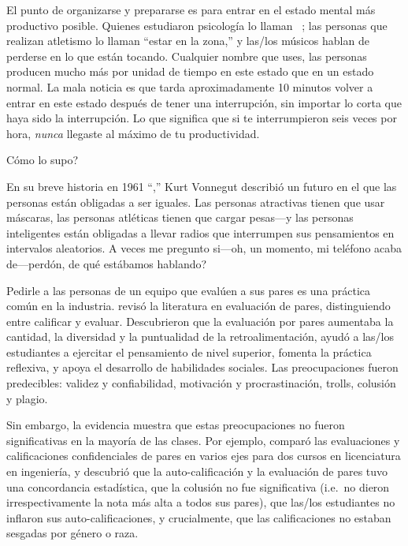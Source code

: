 El punto de organizarse y prepararse es
para entrar en el estado mental más productivo posible.
Quienes estudiaron psicología lo llaman ~\cite{Csik2008};
las personas que realizan atletismo lo llaman ``estar en la zona,''
y las/los músicos hablan de perderse en lo que están tocando.
Cualquier nombre que uses,
las personas producen mucho más por unidad de tiempo en este estado que en un estado normal.
La mala noticia es que
tarda aproximadamente 10 minutos volver a entrar en este estado después de tener una interrupción,
sin importar lo corta que haya sido la interrupción.
Lo que significa que si te interrumpieron seis veces por hora,
\emph{nunca} llegaste al máximo de tu productividad.

\newpage

\begin{aside}{Cómo lo supo?}

  En su breve historia en 1961 ``,''
  Kurt Vonnegut describió un futuro en el que las personas están obligadas a ser iguales.
  Las personas atractivas tienen que usar máscaras,
  las personas atléticas tienen que cargar pesas---y las personas inteligentes
  están obligadas a llevar radios que interrumpen sus pensamientos en intervalos aleatorios.
  A veces me pregunto si---oh, un momento, mi teléfono acaba de---perdón, de qué estábamos hablando?

\end{aside}


Pedirle a las personas de un equipo que evalúen a sus pares es una práctica común en la industria.
\cite{Sond2012} revisó la literatura en evaluación de pares,
distinguiendo entre calificar y evaluar.
Descubrieron que la evaluación por pares aumentaba la cantidad, la diversidad y la puntualidad de la retroalimentación,
ayudó a las/los estudiantes a ejercitar el pensamiento de nivel superior,
fomenta la práctica reflexiva,
y apoya el desarrollo de habilidades sociales.
Las preocupaciones fueron predecibles:
validez y confiabilidad,
motivación y procrastinación,
trolls, colusión y plagio.

Sin embargo,
la evidencia muestra que estas preocupaciones no fueron significativas en la mayoría de las clases.
Por ejemplo,
\cite{Kauf2000} comparó las evaluaciones y calificaciones confidenciales de pares en varios ejes
para dos cursos en licenciatura en ingeniería,
y descubrió que la auto-calificación y la evaluación de pares tuvo una concordancia estadística,
que la colusión no fue significativa (i.e.\ no dieron irrespectivamente la nota más alta a todos sus pares),
que las/los estudiantes no inflaron sus auto-calificaciones,
y crucialmente,
que las calificaciones no estaban sesgadas por género o raza.

